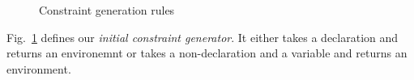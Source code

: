 \documentclass{jfp1}
\newcommand{\myfigure}{figure}
\newcommand{\sizeintablesp}{footnotesize}
\begin{document}
%
\begin{\myfigure}[!t]
  
  \caption{Constraint generation rules}
  \label{fig:consGenAlgo}
\end{\myfigure}
%
Fig.~\ref{fig:consGenAlgo} defines
%
%
%
our \emph{initial constraint generator}.
%
It either takes a declaration and returns an environemnt or takes a
non-declaration and a variable and returns an environment.
%
%

\end{document}
